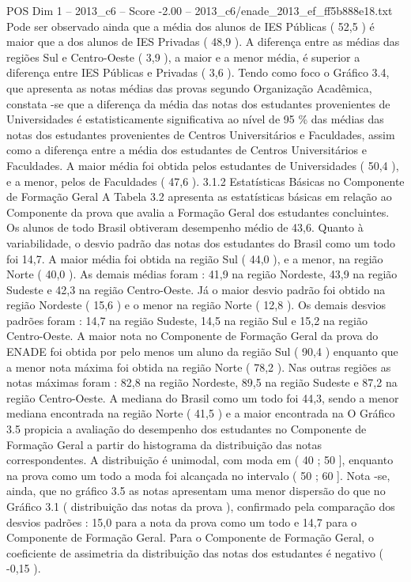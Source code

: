 \begin{textsample}{POS Dim 1 – 2013\_c6 – Score -2.00 – 2013\_c6/enade\_2013\_ef\_ff5b888e18.txt}
Pode ser observado ainda que a média dos alunos de IES Públicas ( 52,5 ) é maior que a dos alunos de IES Privadas ( 48,9 ).
A diferença entre as médias das regiões Sul e Centro-Oeste ( 3,9 ), a maior e a menor média, é superior a diferença entre IES Públicas e Privadas ( 3,6 ).
Tendo como foco o Gráfico 3.4, que apresenta as notas médias das provas segundo Organização Acadêmica, constata -se que a diferença da média das notas dos estudantes provenientes de Universidades é estatisticamente significativa ao nível de 95 \% das médias das notas dos estudantes provenientes de Centros Universitários e Faculdades, assim como a diferença entre a média dos estudantes de Centros Universitários e Faculdades.
A maior média foi obtida pelos estudantes de Universidades ( 50,4 ), e a menor, pelos de Faculdades ( 47,6 ). 3.1.2 Estatísticas Básicas no Componente de Formação Geral A Tabela 3.2 apresenta as estatísticas básicas em relação ao Componente da prova que avalia a Formação Geral dos estudantes concluintes.
Os alunos de todo Brasil obtiveram desempenho médio de 43,6.
Quanto à variabilidade, o desvio padrão das notas dos estudantes do Brasil como um todo foi 14,7.
A maior média foi obtida na região Sul ( 44,0 ), e a menor, na região Norte ( 40,0 ).
As demais médias foram : 41,9 na região Nordeste, 43,9 na região Sudeste e 42,3 na região Centro-Oeste.
Já o maior desvio padrão foi obtido na região Nordeste ( 15,6 ) e o menor na região Norte ( 12,8 ).
Os demais desvios padrões foram : 14,7 na região Sudeste, 14,5 na região Sul e 15,2 na região Centro-Oeste.
A maior nota no Componente de Formação Geral da prova do ENADE foi obtida por pelo menos um aluno da região Sul ( 90,4 ) enquanto que a menor nota máxima foi obtida na região Norte ( 78,2 ).
Nas outras regiões as notas máximas foram : 82,8 na região Nordeste, 89,5 na região Sudeste e 87,2 na região Centro-Oeste.
A mediana do Brasil como um todo foi 44,3, sendo a menor mediana encontrada na região Norte ( 41,5 ) e a maior encontrada na O Gráfico 3.5 propicia a avaliação do desempenho dos estudantes no Componente de Formação Geral a partir do histograma da distribuição das notas correspondentes.
A distribuição é unimodal, com moda em ( 40 ; 50 ], enquanto na prova como um todo a moda foi alcançada no intervalo ( 50 ; 60 ].
Nota -se, ainda, que no gráfico 3.5 as notas apresentam uma menor dispersão do que no Gráfico 3.1 ( distribuição das notas da prova ), confirmado pela comparação dos desvios padrões : 15,0 para a nota da prova como um todo e 14,7 para o Componente de Formação Geral.
Para o Componente de Formação Geral, o coeficiente de assimetria da distribuição das notas dos estudantes é negativo ( -0,15 ).

\end{textsample}
